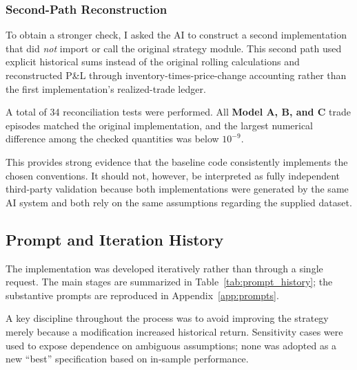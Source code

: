 \documentclass{article}
\begin{document}
\subsubsection{Second-Path Reconstruction}

To obtain a stronger check, I asked the AI to construct a second implementation that did \emph{not} import or call the original strategy module. This second path used explicit historical sums instead of the original rolling calculations and reconstructed P\&L through inventory-times-price-change accounting rather than the first implementation's realized-trade ledger.

A total of 34 reconciliation tests were performed. All\textbf{ Model A, B, and C} trade episodes matched the original implementation, and the largest numerical difference among the checked quantities was below $10^{-9}$.

This provides strong evidence that the baseline code consistently implements the chosen conventions. It should not, however, be interpreted as fully independent third-party validation because both implementations were generated by the same AI system and both rely on the same assumptions regarding the supplied dataset.


\subsection{Prompt and Iteration History}

The implementation was developed iteratively rather than through a single request. The main stages are summarized in Table~\ref{tab:prompt_history}; the substantive prompts are reproduced in Appendix~\ref{app:prompts}.

A key discipline throughout the process was to avoid improving the strategy merely because a modification increased historical return. Sensitivity cases were used to expose dependence on ambiguous assumptions; none was adopted as a new ``best'' specification based on in-sample performance.
\end{document}
